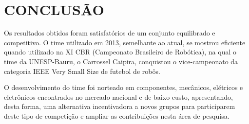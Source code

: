 \section*{CONCLUS{\~A}O} 
Os resultados obtidos foram satisfat{\'o}rios de um conjunto
equilibrado e competitivo. O time utilizado em 2013,
semelhante ao atual, se mostrou eficiente quando utilizado na
XI CBR (Campeonato Brasileiro de Rob{\'o}tica), na qual o time
da UNESP-Bauru, o Carrossel Caipira, conquistou o
vice-campeonato da categoria IEEE Very Small Size de
futebol de rob{\^o}s.

O desenvolvimento do time foi norteado em componentes,
mec{\^a}nicos, el{\'e}tricos e eletr{\^o}nicos encontrados no mercado
nacional e de baixo custo, apresentando, desta forma, uma
alternativa incentivadora a novos grupos para participarem
deste tipo de competi{\c c}{\~a}o e ampliar as contribui{\c c}ões nesta {\'a}rea
de pesquisa. 
